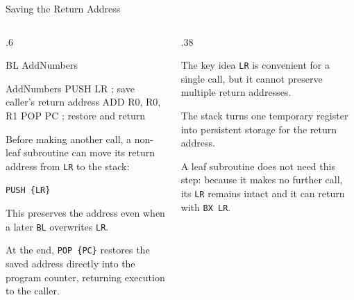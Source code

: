 \documentclass[9pt,aspectratio=169,xcolor=table]{beamer}
\begin{document}
\begin{frame}[fragile]{Saving the Return Address}
	\begin{columns}[T]
		\begin{column}{.6\textwidth}
			\begin{asm}[basicstyle=\small\ttfamily]
		BL    AddNumbers

AddNumbers
		PUSH  {LR}      ; save caller's return address
		ADD   R0, R0, R1
		POP   {PC}      ; restore and return
			\end{asm}

			\vspace{3mm}
			{\small
				Before making another call, a non-leaf subroutine
				can move its return address from \texttt{LR} to the
				stack:

				\begin{center}
					\texttt{PUSH \{LR\}}
				\end{center}

				This preserves the address even when a later
				\texttt{BL} overwrites \texttt{LR}.

				\vspace{1mm}
				At the end, \texttt{POP \{PC\}} restores the saved
				address directly into the program counter, returning
				execution to the caller.
			}
		\end{column}

		\begin{column}{.38\textwidth}
			\begin{block}{The key idea}
				\texttt{LR} is convenient for a single call, but it
				cannot preserve multiple return addresses.

				\vspace{2mm}
				\alert{The stack turns one temporary register into
					persistent storage for the return address.}
			\end{block}

			\vspace{2mm}
			{\small
				A leaf subroutine does not need this step: because it
				makes no further call, its \texttt{LR} remains intact
				and it can return with \texttt{BX LR}.
			}
		\end{column}
	\end{columns}
\end{frame}
\end{document}
